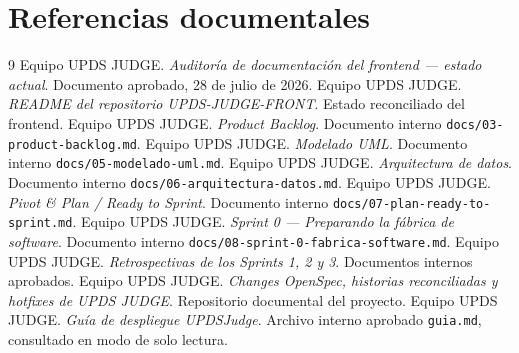 \documentclass[11pt,a4paper]{article}
\begin{document}
\section{Referencias documentales}
\begin{thebibliography}{9}
 Equipo UPDS JUDGE. \emph{Auditoría de documentación del frontend --- estado actual}. Documento aprobado, 28 de julio de 2026.
 Equipo UPDS JUDGE. \emph{README del repositorio UPDS-JUDGE-FRONT}. Estado reconciliado del frontend.
 Equipo UPDS JUDGE. \emph{Product Backlog}. Documento interno \texttt{docs/03-product-backlog.md}.
 Equipo UPDS JUDGE. \emph{Modelado UML}. Documento interno \texttt{docs/05-modelado-uml.md}.
 Equipo UPDS JUDGE. \emph{Arquitectura de datos}. Documento interno \texttt{docs/06-arquitectura-datos.md}.
 Equipo UPDS JUDGE. \emph{Pivot \& Plan / Ready to Sprint}. Documento interno \texttt{docs/07-plan-ready-to-sprint.md}.
 Equipo UPDS JUDGE. \emph{Sprint 0 --- Preparando la fábrica de software}. Documento interno \texttt{docs/08-sprint-0-fabrica-software.md}.
 Equipo UPDS JUDGE. \emph{Retrospectivas de los Sprints 1, 2 y 3}. Documentos internos aprobados.
 Equipo UPDS JUDGE. \emph{Changes OpenSpec, historias reconciliadas y hotfixes de UPDS JUDGE}. Repositorio documental del proyecto.
 Equipo UPDS JUDGE. \emph{Guía de despliegue UPDSJudge}. Archivo interno aprobado \texttt{guia.md}, consultado en modo de solo lectura.
\end{thebibliography}
\end{document}
